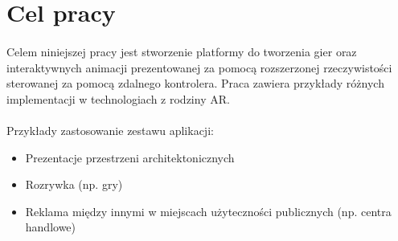 \section{Cel pracy}
\paragraph{}
Celem niniejszej pracy jest stworzenie platformy do tworzenia gier oraz interaktywnych animacji prezentowanej za pomocą rozszerzonej rzeczywistości sterowanej za pomocą zdalnego kontrolera. Praca zawiera przykłady różnych implementacji w technologiach z rodziny AR.

\paragraph{}
Przykłady zastosowanie zestawu aplikacji:

\begin{itemize}
	\item Prezentacje przestrzeni architektonicznych
	\item Rozrywka (np. gry)
	\item Reklama między innymi w miejscach użyteczności publicznych (np. centra handlowe)
\end{itemize}

